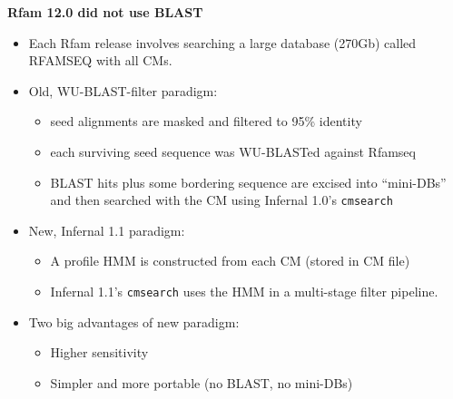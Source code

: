 \documentclass[landscape]{slides}
\begin{document}
\begin{slide}
\begin{center}
\small \textbf{Rfam 12.0 did not use BLAST}
\end{center}
\tiny

\begin{itemize}
\item Each Rfam release involves searching a large database (270Gb) called RFAMSEQ 
with all CMs. 

\item Old, WU-BLAST-filter paradigm:

\begin{itemize}
\item
seed alignments are masked and filtered to 95\% identity
\item
each surviving seed sequence was WU-BLASTed against Rfamseq
\item 
BLAST hits plus some bordering sequence are excised into ``mini-DBs''
and then searched with the CM using Infernal 1.0's \texttt{cmsearch}
\end{itemize}

\item New, Infernal 1.1 paradigm:
\begin{itemize}
  \item A profile HMM is constructed from each CM (stored in CM file)
  \item Infernal 1.1's \texttt{cmsearch} uses the HMM in a multi-stage filter pipeline. 
\end{itemize}

\item Two big advantages of new paradigm:
\begin{itemize}
  \item Higher sensitivity
  \item Simpler and more portable (no BLAST, no mini-DBs)
\end{itemize}

\end{itemize}


\vfill
\end{slide}
\end{document}
